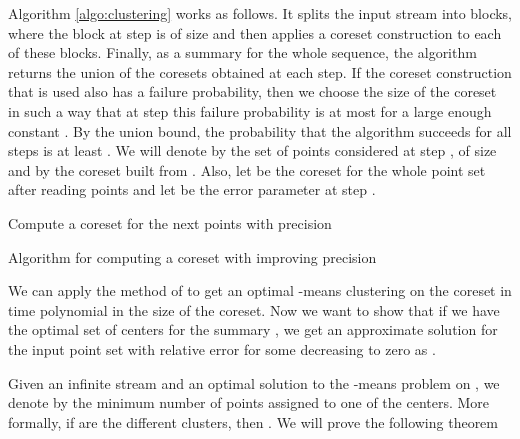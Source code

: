 \documentclass[a4paper,11pt,oneside,english,onecolumn]{article}
\theoremstyle{definition}
\begin{document}
Algorithm \ref{algo:clustering} works as follows. It splits the input stream into blocks, where the block at step  is of size  and then applies a coreset construction to each of these blocks. Finally, as a summary for the whole sequence, the algorithm returns the union of the coresets obtained at each step. If the coreset construction that is used also has a failure probability, then we choose the size of the coreset in such a way that at step  this failure probability is at most  for a large enough constant . By the union bound, the probability that the algorithm succeeds for all steps is at least . We will denote by  the set of points considered at step , of size  and by  the coreset built from . Also, let  be the coreset for the whole point set  after reading  points and let  be the error parameter at step . 

\begin{algorithm}
\DontPrintSemicolon {}
\;
 {
  Compute a coreset  for the next  points with precision  \;
  \;
}
\Return \;
\caption{Algorithm for computing a coreset with improving precision}
\label{algo:clustering}
\end{algorithm}

We can apply the method of \cite{ExactKMeans} to get an optimal -means clustering on the coreset in time polynomial in the size of the coreset. Now we want to show that if we have the optimal set of centers for the summary , we get an approximate solution for the input point set with  relative error for some  decreasing to zero as .

Given an infinite stream  and an optimal solution  to the -means problem on , we denote by  the minimum number of points assigned to one of the centers. More formally, if  are the different clusters, then . We will prove the following theorem
\end{document}
